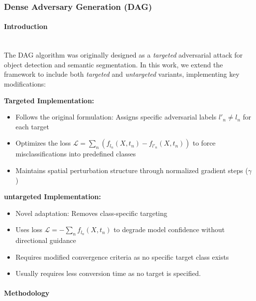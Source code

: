 \documentclass[../main.tex]{subfiles}
\begin{document}
\subsubsection{Dense Adversary Generation (DAG)}

\paragraph{Introduction}\leavevmode\\
The DAG algorithm \cite{xie2017DAG} was originally designed as a \textit{targeted} adversarial attack for object detection and semantic segmentation. In this work, we extend the framework to include both \textit{targeted} and \textit{untargeted} variants, implementing key modifications:

\noindent\textbf{Targeted Implementation:}
\begin{itemize}
    \item Follows the original formulation: Assigns specific adversarial labels $l'_n \neq l_n$ for each target
    \item Optimizes the loss $\mathcal{L} = \sum_{n} (f_{l_n}(X,t_n) - f_{l'_n}(X,t_n))$ to force misclassifications into predefined classes
    \item Maintains spatial perturbation structure through normalized gradient steps ($\gamma$)
\end{itemize}

\noindent\textbf{untargeted Implementation:}
\begin{itemize}
    \item Novel adaptation: Removes class-specific targeting
    \item Uses loss $\mathcal{L} = -\sum_{n} f_{l_n}(X,t_n)$ to degrade model confidence without directional guidance
    \item Requires modified convergence criteria as no specific target class exists
    \item Usually requires less conversion time as no target is specified.   
\end{itemize}

\paragraph{Methodology}\leavevmode\\
\end{document}
